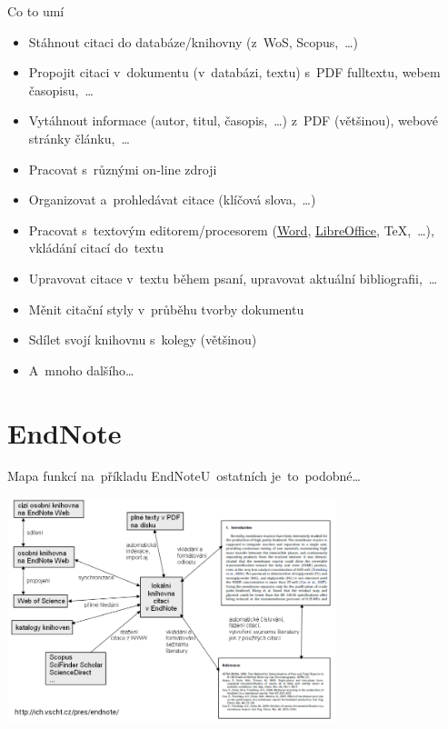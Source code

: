 \documentclass[compress, ucs, xelatex, 11pt, xcolor=svgnames, aspectratio=169,
	hyperref={
		bookmarks=true,
		unicode=true,
		colorlinks=true,
		pdftitle={Citacni software},
		plainpages=false,
		pdfauthor={Vojtech Zeisek},
		pdfsubject={Kratky uvod do citacniho software},
		pdfcreator={XeLaTeX},
		pdfkeywords={citace, reference, software, literatura},
		linkcolor=Crimson, %
		anchorcolor=Magenta, %
		citecolor=Magenta, %
		filecolor=Magenta, %
		menucolor=Magenta, %
		urlcolor=DarkTurquoise, %
		pdftex},
	url={hyphens, lowtilde} %
	]{beamer}
\begin{document}
\begin{frame}{Co to umí}
	\begin{itemize}
		\item Stáhnout citaci do databáze/knihovny (z~WoS, Scopus,~\ldots)
		\item Propojit citaci v~dokumentu (v~databázi, textu) s~PDF fulltextu, webem časopisu,~\ldots
		\item Vytáhnout informace (autor, titul, časopis,~\ldots) z~PDF (většinou), webové stránky článku,~\ldots
		\item Pracovat s~různými on-line zdroji
		\item Organizovat a~prohledávat citace (klíčová slova,~\ldots)
		\item Pracovat s~textovým editorem/procesorem (\href{https://www.natur.cuni.cz/fakulta/cit/podpora-uzivatelu/softwarove-licence}{Word}, \href{https://www.openoffice.cz/}{LibreOffice}, \TeX,~\ldots), vkládání citací do~textu
		\item Upravovat citace v~textu během psaní, upravovat aktuální bibliografii,~\ldots
		\item Měnit citační styly v~průběhu tvorby dokumentu
		\item Sdílet svojí knihovnu s~kolegy (většinou)
		\item A~mnoho dalšího\ldots
	\end{itemize}
\end{frame}

\section{EndNote}

\begin{frame}{Mapa funkcí na~příkladu EndNote}{U~ostatních je~to~podobné\ldots}
	\begin{center}
		\includegraphics[height=6.5cm]{mapa_funkci.png}
	\end{center}
\end{frame}
\end{document}

